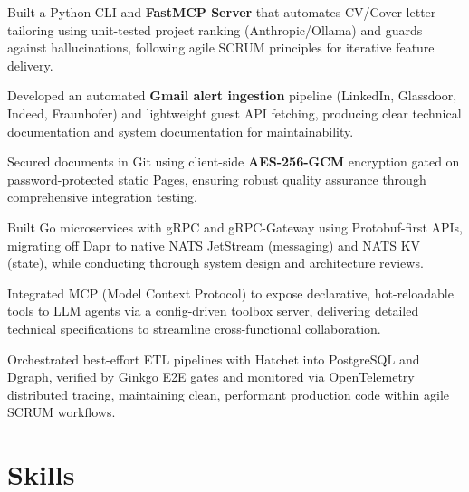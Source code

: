 \documentclass[10pt,a4paper]{resume}
\begin{document}
\bullets
  \item Built a Python CLI and \textbf{FastMCP Server} that automates CV/Cover letter tailoring using unit-tested project ranking (Anthropic/Ollama) and guards against hallucinations, following agile SCRUM principles for iterative feature delivery.
  \item Developed an automated \textbf{Gmail alert ingestion} pipeline (LinkedIn, Glassdoor, Indeed, Fraunhofer) and lightweight guest API fetching, producing clear technical documentation and system documentation for maintainability.
  \item Secured documents in Git using client-side \textbf{AES-256-GCM} encryption gated on password-protected static Pages, ensuring robust quality assurance through comprehensive integration testing.
\bulletsend
\vspace{1.0pt}
\bullets
  \item Built Go microservices with gRPC and gRPC-Gateway using Protobuf-first APIs, migrating off Dapr to native NATS JetStream (messaging) and NATS KV (state), while conducting thorough system design and architecture reviews.
  \item Integrated MCP (Model Context Protocol) to expose declarative, hot-reloadable tools to LLM agents via a config-driven toolbox server, delivering detailed technical specifications to streamline cross-functional collaboration.
  \item Orchestrated best-effort ETL pipelines with Hatchet into PostgreSQL and Dgraph, verified by Ginkgo E2E gates and monitored via OpenTelemetry distributed tracing, maintaining clean, performant production code within agile SCRUM workflows.
\bulletsend

\section{Skills}
\end{document}
